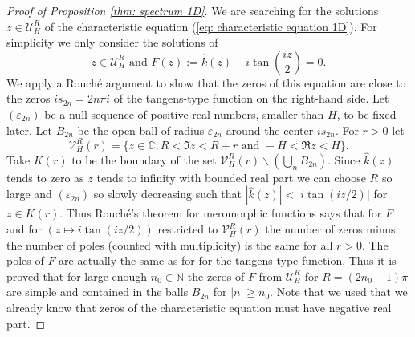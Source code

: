 \documentclass{amsart}
\newcommand{\abs}[1]{\left|#1\right|}
\newcommand{\Veps}{{\mathcal{V}_H^R}}
\newcommand{\Ueps}{{\mathcal{U}_H^R}}
\newcommand{\khat}{\hat{k}}
\newcommand{\C}{\mathbb{C}}
\newcommand{\N}{\mathbb{N}}
\begin{document}
\begin{proof}[Proof of Proposition \ref{thm: spectrum 1D}]
 We are searching for the solutions $z\in\Ueps$ of the characteristic equation (\ref{eq: characteristic equation 1D}). For simplicity we only consider the solutions of
 \begin{equation}\nonumber
  z\in\Ueps \text{ and } F(z) := \khat(z) - i\tan\left(\frac{iz}{2}\right) = 0.
 \end{equation}
 We apply a Rouch\'e argument to show that the zeros of this equation are close to the zeros $is_{2n}=2n\pi i$ of the tangens-type function on the right-hand side. Let $(\varepsilon_{2n})$ be a null-sequence of positive real numbers, smaller than $H$, to be fixed later. Let $B_{2n}$ be the open ball of radius $\varepsilon_{2n}$ around the center $is_{2n}$. For $r>0$ let 
 \begin{equation}
  \Veps(r)=\{z\in\C; R < \Im z < R+r \text{ and } -H < \Re z < H\}. 
 \end{equation}
 Take $K(r)$ to be the boundary of the set $\Veps(r)\backslash (\bigcup_n B_{2n})$. Since $\khat(z)$ tends to zero as $z$ tends to infinity with bounded real part we can choose $R$ so large and $(\varepsilon_{2n})$ so slowly decreasing such that $|\khat(z)|<\abs{i\tan(iz/2)}$ for $z\in K(r)$. Thus Rouch\'e's theorem for meromorphic functions says that for $F$ and for $(z\mapsto i\tan(iz/2))$ restricted to $\Veps(r)$ the number of zeros minus the number of poles (counted with multiplicity) is the same for all $r>0$. The poles of $F$ are actually the same as for for the tangens type function. Thus it is proved that for large enough $n_0\in\N$ the zeros of $F$ from $\Ueps$ for $R=(2n_0-1)\pi$ are simple and contained in the balls $B_{2n}$ for $\abs{n}\geq n_0$. Note that we used that we already know that zeros of the characteristic equation must have negative real part.
 

\end{proof}
\end{document}

